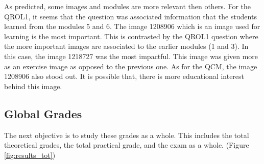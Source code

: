 \documentclass[a4paper,11pt]{report}
\numberwithin{figure}{section} %
\begin{document}
    As predicted, some images and modules are more relevant then others.
    For the QROL1, it seems that the question was associated information that the students learned from the modules 5 and 6.
    The image 1208906 which is an image used for learning is the most important.
    This is contrasted by the QROL1 question where the more important images are associated to the earlier modules (1 and 3).
    In this case, the image 1218727 was the most impactful.
    This image was given more as an exercise image as opposed to the previous one.
    As for the QCM, the image 1208906 also stood out.
    It is possible that, there is more educational interest behind this image.

    \subsection{Global Grades}

    The next objective is to study these grades as a whole.
    This includes the total theoretical grades, the total practical grade, and the exam as a whole. (Figure \ref{fig:results_tot})
\end{document}
